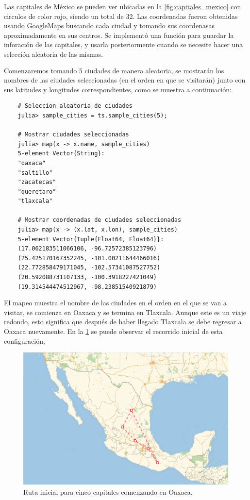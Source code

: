 Las capitales de México se pueden ver ubicadas en la \cref{fig:capitales_mexico} con circulos de color rojo, siendo un total de 32. Las coordenadas fueron obtenidas usando GoogleMaps buscando cada ciudad y tomando sus coordenasas aproximadamente en sus centros. Se implementó una función para guardar la inforación de las capitales,  y usarla posteriormente cuando se necesite hacer una selección aleatoria de las mismas.

Comenzaremos tomando 5 ciudades de manera aleatoria, se mostrarán los nombres de las ciudades seleccionadas (en el orden en que se visitarán) junto con sus latitudes y longitudes correspondientes, como se muestra a continuación:
\begin{verbatim}
    # Seleccion aleatoria de ciudades
    julia> sample_cities = ts.sample_cities(5);

    # Mostrar ciudades seleccionadas
    julia> map(x -> x.name, sample_cities)
    5-element Vector{String}:
    "oaxaca"
    "saltillo"
    "zacatecas"
    "queretaro"
    "tlaxcala"

    # Mostrar coordenadas de ciudades seleccionadas
    julia> map(x -> (x.lat, x.lon), sample_cities)
    5-element Vector{Tuple{Float64, Float64}}:
    (17.062183511066106, -96.72572385123796)
    (25.425170167352245, -101.00211644466016)
    (22.772858479171045, -102.57341087527752)
    (20.592088731107133, -100.3918227421049)
    (19.314544474512967, -98.23851540921879)
\end{verbatim}

El mapeo muestra el nombre de las ciudades en el orden en el que se van a visitar, se comienza en Oaxaca y se termina en Tlaxcala. Aunque este es un viaje redondo, esto significa que después de haber llegado Tlaxcala se debe regresar a Oaxaca nuevamente. En la \cref{fig:trip_cities_05_init} se puede observar el recorrido inicial de esta configuración, 
\begin{figure}[ht!]
    \centering
    \includegraphics[scale=0.8]{../figures/trip_cities_05_init.pdf}
    \caption{Ruta inicial para cinco capitales comenzando en Oaxaca.}
    \label{fig:trip_cities_05_init}
\end{figure}

